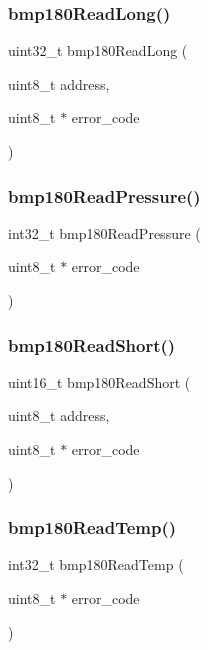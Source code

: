 \subsubsection{bmp180\+Read\+Long()}
{\footnotesize\ttfamily uint32\+\_\+t bmp180\+Read\+Long (\begin{DoxyParamCaption}\item[{uint8\+\_\+t}]{address,  }\item[{uint8\+\_\+t $\ast$}]{error\+\_\+code }\end{DoxyParamCaption})}

\mbox{\label{bmp180__lib_8c_a682c665ea748acfca02cc9abfe4bb6dd}} 
\subsubsection{bmp180\+Read\+Pressure()}
{\footnotesize\ttfamily int32\+\_\+t bmp180\+Read\+Pressure (\begin{DoxyParamCaption}\item[{uint8\+\_\+t $\ast$}]{error\+\_\+code }\end{DoxyParamCaption})}

\mbox{\label{bmp180__lib_8c_a64f6a4684e05c73dee49417f3ddb855e}} 
\subsubsection{bmp180\+Read\+Short()}
{\footnotesize\ttfamily uint16\+\_\+t bmp180\+Read\+Short (\begin{DoxyParamCaption}\item[{uint8\+\_\+t}]{address,  }\item[{uint8\+\_\+t $\ast$}]{error\+\_\+code }\end{DoxyParamCaption})}

\mbox{\label{bmp180__lib_8c_aa1e612710538814b7529f1bc2b3b18d6}} 
\subsubsection{bmp180\+Read\+Temp()}
{\footnotesize\ttfamily int32\+\_\+t bmp180\+Read\+Temp (\begin{DoxyParamCaption}\item[{uint8\+\_\+t $\ast$}]{error\+\_\+code }\end{DoxyParamCaption})}

